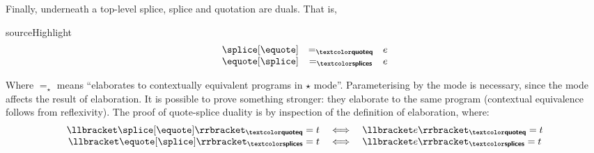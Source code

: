
Finally, underneath a top-level splice, splice and quotation are duals. That is, 
\begin{theorem}{sourceHighlight}\[\begin{array}{rcl}
\splice[{\equote}] & =_{\quotemode{}} & e \\
\equote[{\splice}] & =_{\splicemode{}} & e
\end{array}
\]
\end{theorem}
Where $=_{\star}$ means ``elaborates to contextually equivalent \coreLang{} programs in $\star$ mode''. Parameterising by the mode is necessary, since the mode affects the result of elaboration. It is possible to prove something stronger: they elaborate to the same \coreLang{} program (contextual equivalence follows from reflexivity). The proof of quote-splice duality is by inspection of the definition of elaboration, where:
\[\begin{array}{rcl}  
  \elaborate{\splice[{\equote}]}_{\quotemode{}} = t & \iff & \elaborate{e}_{\quotemode{}} = t\\
  \elaborate{\equote[{\splice}]}_{\splicemode{}} = t & \iff & \elaborate{e}_{\splicemode{}} = t
\end{array}
  \]


